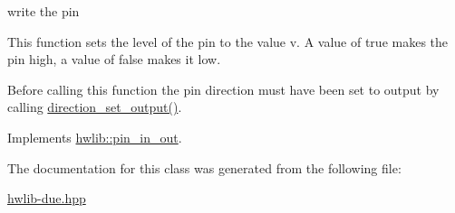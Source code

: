 write the pin 

This function sets the level of the pin to the value v. A value of true makes the pin high, a value of false makes it low.

Before calling this function the pin direction must have been set to output by calling \hyperlink{classdue_1_1pin__in__out_a9b77a85073f07e552871d4d67577d4a0}{direction\+\_\+set\+\_\+output()}. 

Implements \hyperlink{classhwlib_1_1pin__in__out_a198c4d27a9783f4c17e8f5dfd9aca6a9}{hwlib\+::pin\+\_\+in\+\_\+out}.



The documentation for this class was generated from the following file\+:\begin{DoxyCompactItemize}
\item 
\hyperlink{hwlib-due_8hpp}{hwlib-\/due.\+hpp}\end{DoxyCompactItemize}
